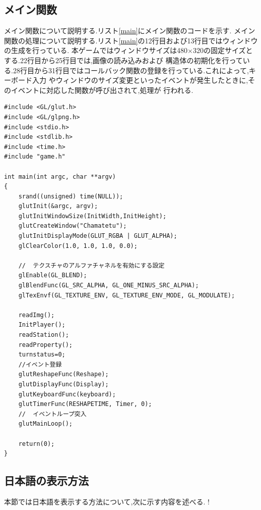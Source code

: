 \documentclass[a4j]{jarticle}
\begin{document}
    \subsection{メイン関数}
    メイン関数について説明する.リスト\ref{main}にメイン関数のコードを示す.
    メイン関数の処理について説明する.リスト\ref{main}の12行目および13行目ではウィンドウの生成を行っている.
    本ゲームではウィンドウサイズは480$\times$320の固定サイズとする.22行目から25行目では,画像の読み込みおよび
    構造体の初期化を行っている.28行目から31行目ではコールバック関数の登録を行っている.これによって,キーボード入力
    やウィンドウのサイズ変更といったイベントが発生したときに,そのイベントに対応した関数が呼び出されて,処理が
    行われる.
    \begin{lstlisting}[basicstyle=\ttfamily\footnotesize, frame=single,label=main,caption=メイン関数]
#include <GL/glut.h>
#include <GL/glpng.h>
#include <stdio.h>
#include <stdlib.h>
#include <time.h>
#include "game.h"

int main(int argc, char **argv)
{
    srand((unsigned) time(NULL));
    glutInit(&argc, argv);
    glutInitWindowSize(InitWidth,InitHeight);
    glutCreateWindow("Chamatetu");
    glutInitDisplayMode(GLUT_RGBA | GLUT_ALPHA);
    glClearColor(1.0, 1.0, 1.0, 0.0);

    //  テクスチャのアルファチャネルを有効にする設定
    glEnable(GL_BLEND);
    glBlendFunc(GL_SRC_ALPHA, GL_ONE_MINUS_SRC_ALPHA);
    glTexEnvf(GL_TEXTURE_ENV, GL_TEXTURE_ENV_MODE, GL_MODULATE);
    
    readImg();
    InitPlayer();
    readStation();
    readProperty();
    turnstatus=0;
    //イベント登録
    glutReshapeFunc(Reshape);
    glutDisplayFunc(Display);
    glutKeyboardFunc(keyboard);
    glutTimerFunc(RESHAPETIME, Timer, 0);
    //  イベントループ突入
    glutMainLoop();

    return(0);
}
                  \end{lstlisting}     
    
    \subsection{日本語の表示方法}
    本節では日本語を表示する方法について,次に示す内容を述べる.
    !
\end{document}
